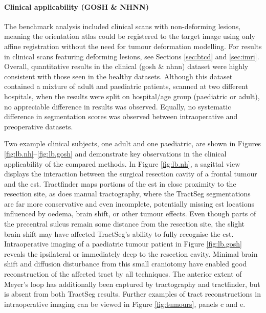 \paragraph*{Clinical applicability (GOSH \& NHNN)}

The benchmark analysis included clinical scans with non-deforming lesions, meaning the orientation atlas could be registered to the target image using only affine registration without the need for tumour deformation modelling.
For results in clinical scans featuring deforming lesions, see Sections \ref{sec:btcd} and \ref{sec:imri}. %
Overall, quantitative results in the clinical (\gls{gosh} \& \gls{nhnn}) dataset were highly consistent with those seen in the healthy datasets.
Although this dataset contained a mixture of adult and paediatric patients, scanned at two different hospitals, when the results were split on hospital/age group (paediatric or adult), no appreciable difference in results was observed.
Equally, no systematic difference in segmentation scores was observed between intraoperative and preoperative datasets.

Two example clinical subjects, one adult and one paediatric, are shown in Figures \ref{fig:lb.nh}--\ref{fig:lb.gosh} and demonstrate key observations in the clinical applicability of the compared methods.
In Figure \ref{fig:lb.nh}, a sagittal view displays the interaction between the surgical resection cavity of a frontal tumour and the \gls{cst}.
Tractfinder maps portions of the \gls{cst} in close proximity to the resection site, as does manual tractography, where the TractSeg segmentations are far more conservative and even incomplete, potentially missing \gls{cst} locations influenced by oedema, brain shift, or other tumour effects.
Even though parts of the precentral sulcus remain some distance from the resection site, the slight brain shift may have affected TractSeg's ability to fully recognise the \gls{cst}.
Intraoperative imaging of a paediatric tumour patient in Figure \ref{fig:lb.gosh} reveals the ipsilateral \gls{or} immediately deep to the resection cavity.
Minimal brain shift and diffusion disturbance from this small craniotomy have enabled good reconstruction of the affected tract by all techniques.
The anterior extent of Meyer's loop has additionally been captured by tractography and tractfinder, but is absent from both TractSeg results.
Further examples of tract reconstructions in intraoperative imaging can be viewed in Figure \ref{fig:tumours}, panels c and e.

